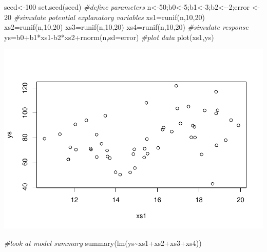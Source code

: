 \documentclass[
]{book}
\newenvironment{Shaded}{\begin{snugshade}}{\end{snugshade}}
\newcommand{\AttributeTok}[1]{\textcolor[rgb]{0.77,0.63,0.00}{#1}}
\newcommand{\CommentTok}[1]{\textcolor[rgb]{0.56,0.35,0.01}{\textit{#1}}}
\newcommand{\DecValTok}[1]{\textcolor[rgb]{0.00,0.00,0.81}{#1}}
\newcommand{\FunctionTok}[1]{\textcolor[rgb]{0.00,0.00,0.00}{#1}}
\newcommand{\NormalTok}[1]{#1}
\newcommand{\OtherTok}[1]{\textcolor[rgb]{0.56,0.35,0.01}{#1}}
\newcommand{\SpecialCharTok}[1]{\textcolor[rgb]{0.00,0.00,0.00}{#1}}
\begin{document}
\begin{Shaded}
\begin{Highlighting}[]
\NormalTok{seed}\OtherTok{\textless{}{-}}\DecValTok{100}
\FunctionTok{set.seed}\NormalTok{(seed)}
\CommentTok{\#define parameters}
\NormalTok{n}\OtherTok{\textless{}{-}}\DecValTok{50}\NormalTok{;b0}\OtherTok{\textless{}{-}}\DecValTok{5}\NormalTok{;b1}\OtherTok{\textless{}{-}}\DecValTok{3}\NormalTok{;b2}\OtherTok{\textless{}{-}}\SpecialCharTok{{-}}\DecValTok{2}\NormalTok{;error }\OtherTok{\textless{}{-}} \DecValTok{20}
\CommentTok{\#simulate potential explanatory variables}
\NormalTok{xs1}\OtherTok{=}\FunctionTok{runif}\NormalTok{(n,}\DecValTok{10}\NormalTok{,}\DecValTok{20}\NormalTok{)}
\NormalTok{xs2}\OtherTok{=}\FunctionTok{runif}\NormalTok{(n,}\DecValTok{10}\NormalTok{,}\DecValTok{20}\NormalTok{)}
\NormalTok{xs3}\OtherTok{=}\FunctionTok{runif}\NormalTok{(n,}\DecValTok{10}\NormalTok{,}\DecValTok{20}\NormalTok{)}
\NormalTok{xs4}\OtherTok{=}\FunctionTok{runif}\NormalTok{(n,}\DecValTok{10}\NormalTok{,}\DecValTok{20}\NormalTok{)}
\CommentTok{\#simulate response}
\NormalTok{ys}\OtherTok{=}\NormalTok{b0}\SpecialCharTok{+}\NormalTok{b1}\SpecialCharTok{*}\NormalTok{xs1}\SpecialCharTok{{-}}\NormalTok{b2}\SpecialCharTok{*}\NormalTok{xs2}\SpecialCharTok{+}\FunctionTok{rnorm}\NormalTok{(n,}\AttributeTok{sd=}\NormalTok{error)}
\CommentTok{\#plot data}
\FunctionTok{plot}\NormalTok{(xs1,ys)}
\end{Highlighting}
\end{Shaded}

\includegraphics{ECOMODbook_files/figure-latex/a7.6-1.pdf}

\begin{Shaded}
\begin{Highlighting}[]
\CommentTok{\#look at model summary}
\FunctionTok{summary}\NormalTok{(}\FunctionTok{lm}\NormalTok{(ys}\SpecialCharTok{\textasciitilde{}}\NormalTok{xs1}\SpecialCharTok{+}\NormalTok{xs2}\SpecialCharTok{+}\NormalTok{xs3}\SpecialCharTok{+}\NormalTok{xs4))}
\end{Highlighting}
\end{Shaded}
\end{document}
